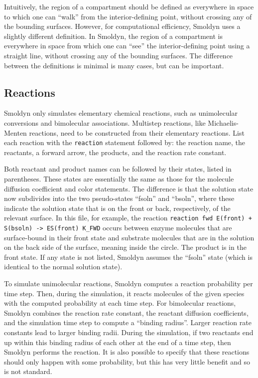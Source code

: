\documentclass {scrbook}
\newcommand {\ttt} {\texttt}
\begin{document}
Intuitively, the region of a compartment should be defined as everywhere in space to which one can ``walk'' from the interior-defining point, without crossing any of the bounding surfaces. However, for computational efficiency, Smoldyn uses a slightly different definition. In Smoldyn, the region of a compartment is everywhere in space from which one can ``see'' the interior-defining point using a straight line, without crossing any of the bounding surfaces. The difference between the definitions is minimal is many cases, but can be important.

\subsection*{Reactions}

Smoldyn only simulates elementary chemical reactions, such as unimolecular conversions and bimolecular associations. Multistep reactions, like Michaelis-Menten reactions, need to be constructed from their elementary reactions. List each reaction with the  \ttt{reaction} statement followed by: the reaction name, the reactants, a forward arrow, the products, and the reaction rate constant.

Both reactant and product names can be followed by their states, listed in parentheses. These states are essentially the same as those for the molecule diffusion coefficient and color statements. The difference is that the solution state now subdivides into the two pseudo-states ``fsoln'' and ``bsoln'', where these indicate the solution state that is on the front or back, respectively, of the relevant surface. In this file, for example, the reaction  \ttt{reaction fwd E(front) + S(bsoln) -> ES(front) K\_FWD} occurs between enzyme molecules that are surface-bound in their front state and substrate molecules that are in the solution on the back side of the surface, meaning inside the circle. The product is in the front state. If any state is not listed, Smoldyn assumes the ``fsoln'' state (which is identical to the normal solution state).

To simulate unimolecular reactions, Smoldyn computes a reaction probability per time step. Then, during the simulation, it reacts molecules of the given species with the computed probability at each time step. For bimolecular reactions, Smoldyn combines the reaction rate constant, the reactant diffusion coefficients, and the simulation time step to compute a ``binding radius''. Larger reaction rate constants lead to larger binding radii. During the simulation, if two reactants end up within this binding radius of each other at the end of a time step, then Smoldyn performs the reaction. It is also possible to specify that these reactions should only happen with some probability, but this has very little benefit and so is not standard.
\end{document}
